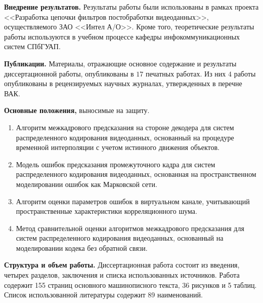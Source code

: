 \textbf{Внедрение результатов.} Результаты работы были использованы в рамках проекта <<Разработка цепочки фильтров постобработки видеоданных>>, осуществляемого ЗАО <<Интел А/О>>. Кроме того, теоретические результаты работы используются в учебном процессе кафедры инфокоммуникационных систем СПбГУАП.

\textbf{Публикации.} Материалы, отражающие основное содержание и результаты диссертационной работы, опубликованы в $17$ печатных работах. Из них 
$4$ работы опубликованы в рецензируемых научных журналах, утвержденных в перечне ВАК.

\textbf{Основные положения,} выносимые на защиту.
\begin{enumerate}
\item Алгоритм межкадрового предсказания на стороне декодера для систем распределенного кодирования видеоданных, основанный на процедуре временной интерполяции с учетом истинного движения объектов.
\item Модель ошибок предсказания промежуточного кадра для систем распределенного кодирования видеоданных, основанная на пространственном моделировании ошибок как Марковской сети.
\item Алгоритм оценки параметров ошибок в виртуальном канале, учитывающий пространственные характеристики корреляционного шума.
\item Метод сравнительной оценки алгоритмов межкадрового предсказания для систем распределенного кодирования видеоданных, основанный на моделировании кодека без обратной связи.
\end{enumerate}

\textbf{Структура и объем работы.} Диссертационная работа состоит из введения, четырех разделов, заключения и списка использованных источников. Работа содержит 155 страниц основного машинописного текста, 36 рисунков и 5 таблиц. Список использованной литературы содержит 89 наименований.